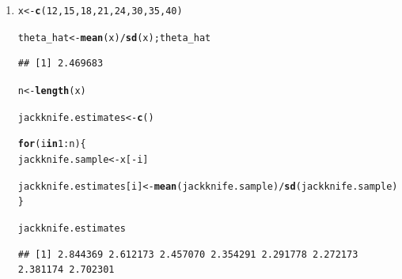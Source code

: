 \documentclass[11pt, a4paper]{article}\usepackage[]{graphicx}\usepackage[]{xcolor}
\makeatletter
\newcommand{\hlnum}[1]{\textcolor[rgb]{0.686,0.059,0.569}{#1}}%
\newcommand{\hlopt}[1]{\textcolor[rgb]{0,0,0}{#1}}%
\newcommand{\hldef}[1]{\textcolor[rgb]{0.345,0.345,0.345}{#1}}%
\newcommand{\hlkwa}[1]{\textcolor[rgb]{0.161,0.373,0.58}{\textbf{#1}}}%
\newcommand{\hlkwb}[1]{\textcolor[rgb]{0.69,0.353,0.396}{#1}}%
\newcommand{\hlkwd}[1]{\textcolor[rgb]{0.737,0.353,0.396}{\textbf{#1}}}%
\newenvironment{kframe}{%
 \def\at@end@of@kframe{}%
 \ifinner\ifhmode%
  \def\at@end@of@kframe{\end{minipage}}%
  \begin{minipage}{\columnwidth}%
 \fi\fi%
 \def\FrameCommand##1{\hskip\@totalleftmargin \hskip-\fboxsep
 \colorbox{shadecolor}{##1}\hskip-\fboxsep
     \hskip-\linewidth \hskip-\@totalleftmargin \hskip\columnwidth}%
 \MakeFramed {\advance\hsize-\width
   \@totalleftmargin\z@ \linewidth\hsize
   \@setminipage}}%
 {\par\unskip\endMakeFramed%
 \at@end@of@kframe}
\newenvironment{knitrout}{}{} %
\makeatother
\begin{document}
\begin{enumerate}

\item[\scalebox{2.0}{\twemoji{keycap: 1}}]



\begin{knitrout}
\color{fgcolor}\begin{kframe}
\begin{alltt}
\hldef{x} \hlkwb{<-} \hlkwd{c}\hldef{(}\hlnum{12}\hldef{,} \hlnum{15}\hldef{,} \hlnum{18}\hldef{,} \hlnum{21}\hldef{,} \hlnum{24}\hldef{,} \hlnum{30}\hldef{,} \hlnum{35}\hldef{,} \hlnum{40}\hldef{)}

\hldef{theta_hat} \hlkwb{<-} \hlkwd{mean}\hldef{(x)} \hlopt{/} \hlkwd{sd}\hldef{(x); theta_hat}
\end{alltt}
\begin{verbatim}
## [1] 2.469683
\end{verbatim}
\end{kframe}
\end{knitrout}

\begin{knitrout}
\color{fgcolor}\begin{kframe}
\begin{alltt}
\hldef{n} \hlkwb{<-} \hlkwd{length}\hldef{(x)}
\end{alltt}
\end{kframe}
\end{knitrout}

\begin{knitrout}
\color{fgcolor}\begin{kframe}
\begin{alltt}
\hldef{jackknife.estimates} \hlkwb{<-} \hlkwd{c}\hldef{()}

\hlkwa{for} \hldef{(i} \hlkwa{in} \hlnum{1}\hlopt{:}\hldef{n) \{}
  \hldef{jackknife.sample} \hlkwb{<-} \hldef{x[}\hlopt{-}\hldef{i]}

  \hldef{jackknife.estimates[i]} \hlkwb{<-} \hlkwd{mean}\hldef{(jackknife.sample)} \hlopt{/} \hlkwd{sd}\hldef{(jackknife.sample)}
\hldef{\}}

\hldef{jackknife.estimates}
\end{alltt}
\begin{verbatim}
## [1] 2.844369 2.612173 2.457070 2.354291 2.291778 2.272173 2.381174 2.702301
\end{verbatim}
\end{kframe}
\end{knitrout}


\end{enumerate}
\end{document}
